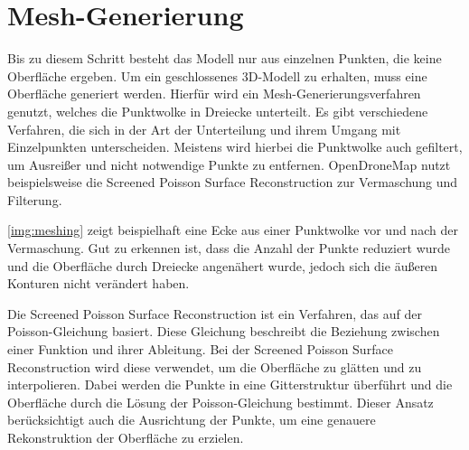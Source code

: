 \documentclass[./00PhotoBox.tex]{subfiles}
\begin{document}
\section{Mesh-Generierung}
Bis zu diesem Schritt besteht das Modell nur aus einzelnen Punkten, die keine Oberfläche ergeben. Um ein geschlossenes 3D-Modell zu erhalten, muss eine Oberfläche generiert werden. Hierfür wird ein Mesh-Generierungsverfahren genutzt, welches die Punktwolke in Dreiecke unterteilt. Es gibt verschiedene Verfahren, die sich in der Art der Unterteilung und ihrem Umgang mit Einzelpunkten unterscheiden. Meistens wird hierbei die Punktwolke auch gefiltert, um Ausreißer und nicht notwendige Punkte zu entfernen. OpenDroneMap nutzt beispielsweise die Screened Poisson Surface Reconstruction zur Vermaschung und Filterung. \citep[vgl.][S. 52f]{opendronemap}

\autoref{img:meshing} zeigt beispielhaft eine Ecke aus einer Punktwolke vor und nach der Vermaschung. Gut zu erkennen ist, dass die Anzahl der Punkte reduziert wurde und die Oberfläche durch Dreiecke angenähert wurde, jedoch sich die äußeren Konturen nicht verändert haben.

Die Screened Poisson Surface Reconstruction ist ein Verfahren, das auf der Poisson-Gleichung basiert. Diese Gleichung beschreibt die Beziehung zwischen einer Funktion und ihrer Ableitung. Bei der Screened Poisson Surface Reconstruction wird diese verwendet, um die Oberfläche zu glätten und zu interpolieren. Dabei werden die Punkte in eine Gitterstruktur überführt und die Oberfläche durch die Lösung der Poisson-Gleichung bestimmt. Dieser Ansatz berücksichtigt auch die Ausrichtung der Punkte, um eine genauere Rekonstruktion der Oberfläche zu erzielen. \citep[vgl.][]{spsr}
\end{document}
